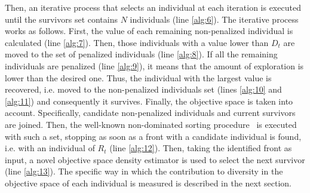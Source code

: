Then, an iterative process that selects an individual at each iteration is executed until the survivors
set contains $N$ individuals (line \ref{alg:6}).
%
The iterative process works as follows.
%
First, the \DCS{} value of each remaining non-penalized individual is calculated (line \ref{alg:7}).
%
Then, those individuals with a \DCS{} value lower than $D_t$ are moved to the set of penalized individuals (line \ref{alg:8}).
%
If all the remaining individuals are penalized (line \ref{alg:9}), it means that the amount of exploration is lower than the
desired one.
%
Thus, the individual with the largest \DCS{} value is recovered, i.e. moved to the non-penalized individuals 
set (lines \ref{alg:10} and \ref{alg:11}) and consequently it survives.
%
Finally, the objective space is taken into account.
%
Specifically, candidate non-penalized individuals and current survivors are joined.
%
Then, the well-known non-dominated sorting procedure~\cite{Joel:NSGAII} is executed with such a set, stopping as soon as a front with 
a candidate individual is found, i.e. with an individual of $R_t$ (line \ref{alg:12}).
%
Then, taking the identified front as input, a novel objective space density estimator is used to select
the next survivor (line \ref{alg:13}).
%
The specific way in which the contribution to diversity in the objective space of each individual is measured is described in the next section.
%

%


%
%
%

%
%
%

